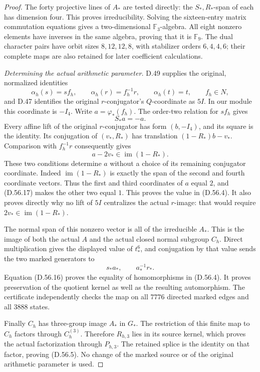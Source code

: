 \begin{proof}
The forty projective lines of \(A_*\) are tested directly:
the \(S_*,R_*\)-span of each has dimension four.
This proves irreducibility. Solving the sixteen-entry
matrix commutation equations gives a two-dimensional
\(\mathbb F_3\)-algebra. All eight nonzero elements
have inverses in the same algebra, proving that it is
\(\mathbb F_9\).
The dual character pairs have orbit sizes
\(8,12,12,8\), with stabilizer orders \(6,4,4,6\);
their complete maps are also retained for later
coefficient calculations.

\emph{Determining the actual arithmetic parameter.}
D.49 supplies the original, normalized identities
\[
       \alpha_h(s)=s f_h,\qquad
       \alpha_h(r)=f_h^{-1}r,\qquad
       \alpha_h(t)=t,\qquad f_h\in N,
 \tag{D.56.16}
\]
and D.47 identifies the original \(r\)-conjugator's
\(Q\)-coordinate as \(5I\).
In our module this coordinate is \(-I_4\).
Write \(a=\varphi_*(f_h)\).
The order-two relation for \(s f_h\) gives
\[
          S_*a=-a .
 \tag{D.56.17}
\]
Every affine lift of the original \(r\)-conjugator
has form \((b,-I_4)\), and its square is the identity.
Its conjugation of \((v_*,R_*)\) has translation
\((1-R_*)b-v_*\).
Comparison with \(f_h^{-1}r\) consequently gives
\[
              a-2v_*\in\operatorname{im}(1-R_*) .
 \tag{D.56.18}
\]
These two conditions determine \(a\) without a choice
of its remaining conjugator coordinate.
Indeed \(\operatorname{im}(1-R_*)\) is exactly the
span of the second and fourth coordinate vectors.
Thus the first and third coordinates of \(a\) equal
\(2\), and (D.56.17) makes the other two equal \(1\).
This proves the value in (D.56.4).
It also proves directly why no lift of \(5I\)
centralizes the actual \(r\)-image: that would require
\(2v_*\in\operatorname{im}(1-R_*)\).

The normal span of this nonzero vector is all of the
irreducible \(A_*\). This is the image of both the
actual \(A\) and the actual closed normal subgroup
\(C_h\). Direct multiplication gives the displayed
value of \(t_*^6\), and conjugation by that value sends
the two marked generators to
\[
               s_*a_*,\qquad a_*^{-1}r_* .
 \tag{D.56.19}
\]
Equation (D.56.16) proves the equality of homomorphisms
in (D.56.4). It proves preservation of the quotient
kernel as well as the resulting automorphism.
The certificate independently checks the map on all
\(7776\) directed marked edges and all \(3888\) states.

Finally \(C_h\) has three-group image \(A_*\) in \(G_*\).
The restriction of this finite map to \(C_h\) factors
through \(C_h^{(3)}\). Therefore
\(R_{h,3}\) lies in its source kernel, which proves
the actual factorization through \(P_{h,3}\).
The retained splice is the identity on that factor,
proving (D.56.5). No change of the marked source
or of the original arithmetic parameter is used.


\end{proof}
